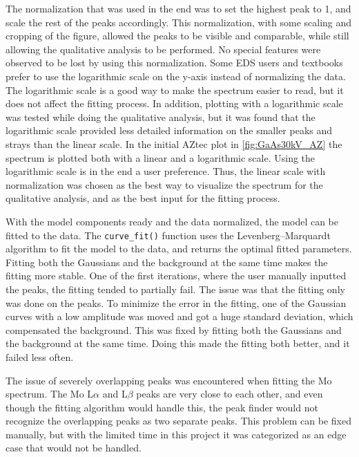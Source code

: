 The normalization that was used in the end was to set the highest peak to 1, and scale the rest of the peaks accordingly.
This normalization, with some scaling and cropping of the figure, allowed the peaks to be visible and comparable, while still allowing the qualitative analysis to be performed.
No special features were observed to be lost by using this normalization.
Some EDS users and textbooks prefer to use the logarithmic scale on the y-axis instead of normalizing the data.
The logarithmic scale is a good way to make the spectrum easier to read, but it does not affect the fitting process.
In addition, plotting with a logarithmic scale was tested while doing the qualitative analysis, but it was found that the logarithmic scale provided less detailed information on the smaller peaks and strays than the linear scale.
In the initial AZtec plot in \cref{fig:GaAs30kV_AZ} the spectrum is plotted both with a linear and a logarithmic scale.
Using the logarithmic scale is in the end a user preference.
Thus, the linear scale with normalization was chosen as the best way to visualize the spectrum for the qualitative analysis, and as the best input for the fitting process.


With the model components ready and the data normalized, the model can be fitted to the data.
The \verb|curve_fit()| function uses the Levenberg–Marquardt algorithm to fit the model to the data, and returns the optimal fitted parameters.
Fitting both the Gaussians and the background at the same time makes the fitting more stable.
One of the first iterations, where the user manually inputted the peaks, the fitting tended to partially fail.
The issue was that the fitting only was done on the peaks.
To minimize the error in the fitting, one of the Gaussian curves with a low amplitude was moved and got a huge standard deviation, which compensated the background.
This was fixed by fitting both the Gaussians and the background at the same time.
Doing this made the fitting both better, and it failed less often.

The issue of severely overlapping peaks was encountered when fitting the Mo spectrum.
The Mo L$\alpha$ and L$\beta$ peaks are very close to each other, and even though the fitting algorithm would handle this, the peak finder would not recognize the overlapping peaks as two separate peaks.
This problem can be fixed manually, but with the limited time in this project it was categorized as an edge case that would not be handled.




